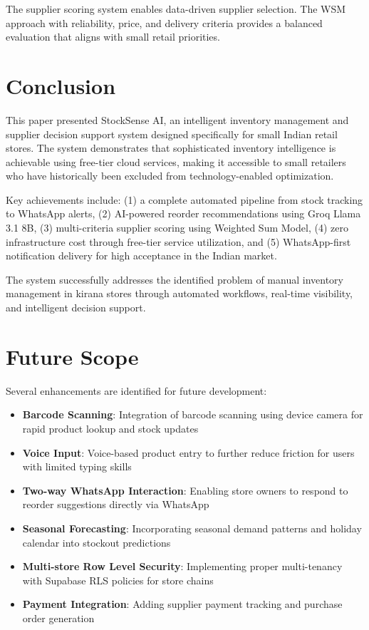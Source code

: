 \documentclass[journal]{IEEEtran}
\begin{document}
The supplier scoring system enables data-driven supplier selection. The WSM approach with reliability, price, and delivery criteria provides a balanced evaluation that aligns with small retail priorities.

\section{Conclusion}

This paper presented StockSense AI, an intelligent inventory management and supplier decision support system designed specifically for small Indian retail stores. The system demonstrates that sophisticated inventory intelligence is achievable using free-tier cloud services, making it accessible to small retailers who have historically been excluded from technology-enabled optimization.

Key achievements include: (1) a complete automated pipeline from stock tracking to WhatsApp alerts, (2) AI-powered reorder recommendations using Groq Llama 3.1 8B, (3) multi-criteria supplier scoring using Weighted Sum Model, (4) zero infrastructure cost through free-tier service utilization, and (5) WhatsApp-first notification delivery for high acceptance in the Indian market.

The system successfully addresses the identified problem of manual inventory management in kirana stores through automated workflows, real-time visibility, and intelligent decision support.

\section{Future Scope}

Several enhancements are identified for future development:

\begin{itemize}
\item \textbf{Barcode Scanning}: Integration of barcode scanning using device camera for rapid product lookup and stock updates
\item \textbf{Voice Input}: Voice-based product entry to further reduce friction for users with limited typing skills
\item \textbf{Two-way WhatsApp Interaction}: Enabling store owners to respond to reorder suggestions directly via WhatsApp
\item \textbf{Seasonal Forecasting}: Incorporating seasonal demand patterns and holiday calendar into stockout predictions
\item \textbf{Multi-store Row Level Security}: Implementing proper multi-tenancy with Supabase RLS policies for store chains
\item \textbf{Payment Integration}: Adding supplier payment tracking and purchase order generation
\end{itemize}
\end{document}
